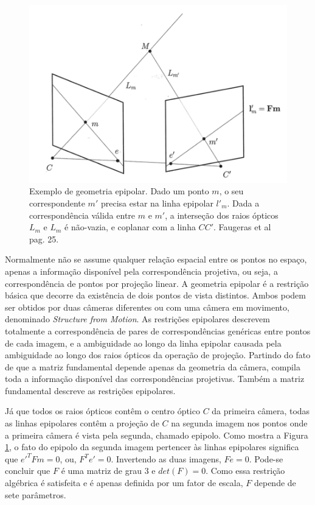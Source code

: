 \begin{figure}[H]
	\centering
		\includegraphics{Imagens/figura2-4.png}
	\caption{Exemplo de geometria epipolar. Dado um ponto $m$, o seu correspondente $m'$ precisa estar na linha epipolar $l'_{m}$. Dada a correspondência válida entre $m$ e $m'$, a interseção dos raios ópticos $L_m$ e $L_m$ é não-vazia, e coplanar com a linha $CC'$. Faugeras et al \cite{Faugeras-Geometry} pag. 25.}
	\label{fig4}
\end{figure}

Normalmente não se assume qualquer relação espacial entre os pontos no espaço, apenas a informação disponível pela correspondência projetiva, ou seja, a correspondência de pontos por projeção linear. A geometria epipolar é a restrição básica que decorre da existência de dois pontos de vista distintos. Ambos podem ser obtidos por duas câmeras diferentes ou com uma câmera em movimento, denominado \textit{Structure from Motion}. As restrições epipolares descrevem totalmente a correspondência de pares de correspondências genéricas entre pontos de cada imagem, e a ambiguidade ao longo da linha epipolar causada pela ambiguidade ao longo dos raios ópticos da operação de projeção. Partindo do fato de que a matriz fundamental depende apenas da geometria da câmera, compila toda a informação disponível das correspondências projetivas. Também a matriz fundamental descreve as restrições epipolares. 

Já que todos os raios ópticos contêm o centro óptico $C$ da primeira câmera, todas as linhas epipolares contêm a projeção de $C$ na segunda imagem nos pontos onde a primeira câmera é vista pela segunda, chamado epipolo. Como mostra a Figura \ref{fig4}, o fato do epipolo da segunda imagem pertencer às linhas epipolares significa que $e'^{T}Fm = 0$, ou, $F^{T}e' = 0$. Invertendo as duas imagens, $Fe = 0$. Pode-se concluir que $F$ é uma matriz de grau 3 e $det(F) = 0$. Como essa restrição algébrica é satisfeita e é apenas definida por um fator de escala, $F$ depende de sete parâmetros.

